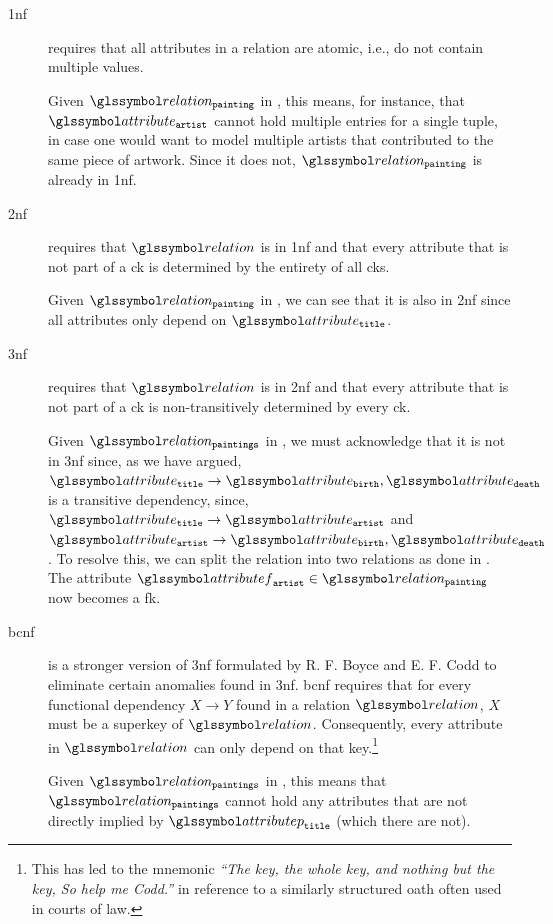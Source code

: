 \begin{description}
    \item[\acrfull{1nf}] \cite{Codd:1970Relational} requires that all attributes in a relation are atomic, i.e., do not contain multiple values.
    
    Given $\relation_{\mathtt{painting}}$ in , this means, for instance, that $\attribute_{\mathtt{artist}}$ cannot hold multiple entries for a single tuple, in case one would want to model multiple artists that contributed to the same piece of artwork. Since it does not, $\relation_{\mathtt{painting}}$ is already in \acrshort{1nf}.
   
    \item[\acrfull{2nf}] \cite{Codd:1972Further} requires that $\relation$ is in \acrshort{1nf} and that every attribute that is not part of a \acrshort{ck} is determined by the entirety of all \acrshort{ck}s.
    
    Given $\relation_{\mathtt{painting}}$ in , we can see that it is also in \acrshort{2nf} since all attributes only depend on $\attribute_\mathtt{title}$.
     
    \item[\acrfull{3nf}] \cite{Codd:1972Further} requires that $\relation$ is in \acrshort{2nf} and that every attribute that is not part of a \acrshort{ck} is non-transitively determined by every \acrshort{ck}. 
    
    Given $\relation_{\mathtt{paintings}}$ in , we must acknowledge that it is not in \acrshort{3nf} since, as we have argued, $\attribute_\mathtt{title} \rightarrow \attribute_{\mathtt{birth}},\attribute_{\mathtt{death}}$ is a transitive dependency, since, $\attribute_\mathtt{title} \rightarrow \attribute_{\mathtt{artist}}$ and $\attribute_{\mathtt{artist}} \rightarrow \attribute_{\mathtt{birth}},\attribute_{\mathtt{death}}$. To resolve this, we can split the relation into two relations as done in . The attribute $\attributef_{\mathtt{artist}} \in \relation_{\mathtt{painting}}$ now becomes a \acrshort{fk}.
    
    \item[\acrfull{bcnf}] \cite{Codd:1974Recent} is a stronger version of \acrshort{3nf} formulated by R. F. Boyce and E. F. Codd to eliminate certain anomalies found in \acrshort{3nf}. \acrshort{bcnf} requires that for every functional dependency $X \rightarrow Y$ found in a relation $\relation$, $X$ must be a superkey of $\relation$. Consequently, every attribute in $\relation$ can only depend on that key.\footnote{This has led to the mnemonic \emph{``The key, the whole key, and nothing but the key, So help me Codd.''} in reference to a similarly structured oath often used in courts of law.}
    
     Given $\relation_{\mathtt{paintings}}$ in , this means that $\relation_{\mathtt{paintings}}$ cannot hold any attributes that are not directly implied by $\attributep_{\mathtt{title}}$ (which there are not).
\end{description}


